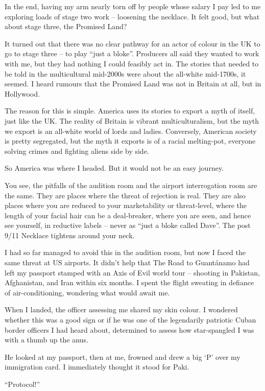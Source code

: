 \documentclass[10pt,a4paper]{article}
\begin{document}
In the end, having my arm nearly torn off by people whose salary I pay led to me exploring loads of stage two work – loosening the necklace. It felt good, but what about stage three, the Promised Land?

It turned out that there was no clear pathway for an actor of colour in the UK to go to stage three – to play “just a bloke”. Producers all said they wanted to work with me, but they had nothing I could feasibly act in. The stories that needed to be told in the multicultural mid-2000s were about the all-white mid-1700s, it seemed. I heard rumours that the Promised Land was not in Britain at all, but in Hollywood.

The reason for this is simple. America uses its stories to export a myth of itself, just like the UK. The reality of Britain is vibrant multiculturalism, but the myth we export is an all-white world of lords and ladies. Conversely, American society is pretty segregated, but the myth it exports is of a racial melting-pot, everyone solving crimes and fighting aliens side by side.

So America was where I headed. But it would not be an easy journey.

You see, the pitfalls of the audition room and the airport interrogation room are the same. They are places where the threat of rejection is real. They are also places where you are reduced to your marketability or threat-level, where the length of your facial hair can be a deal-breaker, where you are seen, and hence see yourself, in reductive labels – never as “just a bloke called Dave”. The post 9/11 Necklace tightens around your neck.

I had so far managed to avoid this in the audition room, but now I faced the same threat at US airports. It didn’t help that The Road to Guantánamo had left my passport stamped with an Axis of Evil world tour – shooting in Pakistan, Afghanistan, and Iran within six months. I spent the flight sweating in defiance of air-conditioning, wondering what would await me.

When I landed, the officer assessing me shared my skin colour. I wondered whether this was a good sign or if he was one of the legendarily patriotic Cuban border officers I had heard about, determined to assess how star-spangled I was with a thumb up the anus.

He looked at my passport, then at me, frowned and drew a big ‘P’ over my immigration card. I immediately thought it stood for Paki.

“Protocol!”
\end{document}
